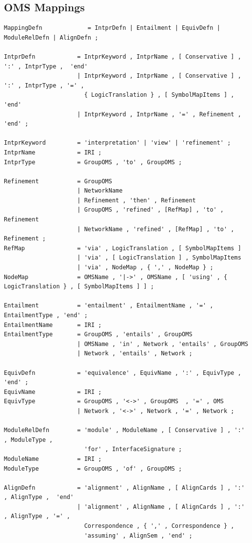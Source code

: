 \documentclass[10pt,fleqn,%
\ifpretendfinal
final%
\else
draft%
\fi,
]{scrreprt}
\newcommand{\ssclause}[1]{\subsection{#1}}
\begin{document}
\ssclause{OMS Mappings}\label{a:dol-text:mappings}
\newcommand*{\lessthan}{<}
\newcommand*{\greaterthan}{>}
\begin{lstlisting}[language=ebnf,mathescape]
MappingDefn             = IntprDefn | Entailment | EquivDefn | ModuleRelDefn | AlignDefn ;

IntprDefn            = IntprKeyword , IntprName , [ Conservative ] , ':' , IntprType ,  'end'
                     | IntprKeyword , IntprName , [ Conservative ] , ':' , IntprType , '=' ,
                       { LogicTranslation } , [ SymbolMapItems ] ,  'end' 
                     | IntprKeyword , IntprName , '=' , Refinement ,  'end' ;

IntprKeyword         = 'interpretation' | 'view' | 'refinement' ;
IntprName            = IRI ;
IntprType            = GroupOMS , 'to' , GroupOMS ;

Refinement           = GroupOMS 
                     | NetworkName
                     | Refinement , 'then' , Refinement
                     | GroupOMS , 'refined' , [RefMap] , 'to' , Refinement 
                     | NetworkName , 'refined' , [RefMap] , 'to' , Refinement ;
RefMap               = 'via' , LogicTranslation , [ SymbolMapItems ]
                     | 'via' , [ LogicTranslation ] , SymbolMapItems
                     | 'via' , NodeMap , { ',' , NodeMap } ;
NodeMap              = OMSName , '|->' , OMSName , [ 'using' , { LogicTranslation } , [ SymbolMapItems ] ] ;

Entailment           = 'entailment' , EntailmentName , '=' , EntailmentType , 'end' ;
EntailmentName       = IRI ;
EntailmentType       = GroupOMS , 'entails' , GroupOMS
                     | OMSName , 'in' , Network , 'entails' , GroupOMS
                     | Network , 'entails' , Network ;

EquivDefn            = 'equivalence' , EquivName , ':' , EquivType ,  'end' ;
EquivName            = IRI ;
EquivType            = GroupOMS , '<->' , GroupOMS  , '=' , OMS 
                     | Network , '<->' , Network , '=' , Network ;

ModuleRelDefn        = 'module' , ModuleName , [ Conservative ] , ':' , ModuleType ,
                       'for' , InterfaceSignature ;
ModuleName           = IRI ;
ModuleType           = GroupOMS , 'of' , GroupOMS ;

AlignDefn            = 'alignment' , AlignName , [ AlignCards ] , ':' , AlignType ,  'end'
                     | 'alignment' , AlignName , [ AlignCards ] , ':' , AlignType , '=' ,
                       Correspondence , { ',' , Correspondence } ,  
                       'assuming' , AlignSem , 'end' ;


\end{lstlisting}
\end{document}
